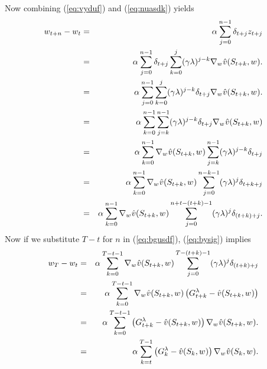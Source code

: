 Now combining (\ref{eq:vyduf}) and (\ref{eq:nuasdk}) yields
\begin{eqnarray}
\nonumber
{w_{t+n}} - {w_{t}}
&=& \alpha_{} \sum_{j=0}^{n-1}  \delta_{t+j} z_{t+j}
\\
\nonumber
&=& \alpha_{} \sum_{j=0}^{n-1}  \delta_{t+j} 
\sum_{k=0}^j (\gamma \lambda)^{j-k} \nabla_{{w_{}}} \hat{v}(S_{t+k},{w_{}}).
\\
\nonumber
&=& \alpha_{} \sum_{j=0}^{n-1} \sum_{k=0}^j (\gamma \lambda)^{j-k}
\delta_{t+j} \nabla_{{w_{}}} \hat{v}(S_{t+k},{w_{}}).
\\
\nonumber
&=& \alpha_{} \sum_{k=0}^{n-1} \sum_{j=k}^{n-1} (\gamma \lambda)^{j-k}
\delta_{t+j} \nabla_{{w_{}}} \hat{v}(S_{t+k},{w_{}})
\\
\nonumber
&=& \alpha_{} \sum_{k=0}^{n-1} \nabla_{{w_{}}} \hat{v}(S_{t+k},{w_{}})
\sum_{j=k}^{n-1} (\gamma \lambda)^{j-k} \delta_{t+j}
\\
\nonumber
&=& \alpha_{} \sum_{k=0}^{n-1} \nabla_{{w_{}}} \hat{v}(S_{t+k},{w_{}})
\sum_{j=0}^{n-k-1} (\gamma \lambda)^{j} \delta_{t+k+j}
\\
\label{eq:bgusdf}
&=& \alpha_{} \sum_{k=0}^{n-1} \nabla_{{w_{}}} \hat{v}(S_{t+k},{w_{}})
\sum_{j=0}^{n+t-(t+k)-1} (\gamma \lambda)^{j} \delta_{(t+k)+j}.
\end{eqnarray}
Now if we substitute $T-t$ for $n$ in (\ref{eq:bgusdf}),
(\ref{eq:bysig}) implies
\begin{eqnarray}
\nonumber
{w_{T}} - {w_{t}}
&=& \alpha_{} \sum_{k=0}^{T-t-1} \nabla_{{w_{}}} \hat{v}(S_{t+k},{w_{}})
\sum_{j=0}^{T-(t+k)-1} (\gamma \lambda)^{j} \delta_{(t+k)+j}
\\
\nonumber
&=& \alpha_{} \sum_{k=0}^{T-t-1} \nabla_{{w_{}}} \hat{v}(S_{t+k},{w_{}})
\left( G^{\lambda}_{t+k} - \hat{v}(S_{t+k}, {w_{}}) \right)
\\
\nonumber
&=& \alpha_{} \sum_{k=0}^{T-t-1}
\left( G^{\lambda}_{t+k} - \hat{v}(S_{t+k}, {w_{}}) \right)
\nabla_{{w_{}}} \hat{v}(S_{t+k},{w_{}}).
\\
&=& \alpha_{} \sum_{k=t}^{T-1}
\left( G^{\lambda}_{k} - \hat{v}(S_{k}, {w_{}}) \right)
\nabla_{{w_{}}} \hat{v}(S_{k},{w_{}}).
\label{eq:ishfg}
\end{eqnarray}

